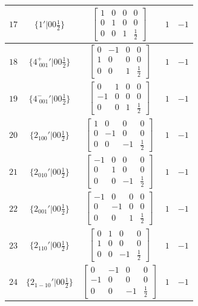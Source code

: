 \documentclass[fleqn,8pt]{jsarticle}
\begin{document}
\begin{longtable}{ccccc}
$ 17 $ & $ \{1{}'|0 0 \frac{1}{2}\} $ & $ \begin{bmatrix} 1 & 0 & 0 & 0 \\ 0 & 1 & 0 & 0 \\ 0 & 0 & 1 & \frac{1}{2} \end{bmatrix} $ & $ 1 $ & $ -1 $ \\ \hline
$ 18 $ & $ \{4^{+}_{\,\,001}{}'|0 0 \frac{1}{2}\} $ & $ \begin{bmatrix} 0 & -1 & 0 & 0 \\ 1 & 0 & 0 & 0 \\ 0 & 0 & 1 & \frac{1}{2} \end{bmatrix} $ & $ 1 $ & $ -1 $ \\ \hline
$ 19 $ & $ \{4^{-}_{\,\,001}{}'|0 0 \frac{1}{2}\} $ & $ \begin{bmatrix} 0 & 1 & 0 & 0 \\ -1 & 0 & 0 & 0 \\ 0 & 0 & 1 & \frac{1}{2} \end{bmatrix} $ & $ 1 $ & $ -1 $ \\ \hline
$ 20 $ & $ \{2{}_{100}{}'|0 0 \frac{1}{2}\} $ & $ \begin{bmatrix} 1 & 0 & 0 & 0 \\ 0 & -1 & 0 & 0 \\ 0 & 0 & -1 & \frac{1}{2} \end{bmatrix} $ & $ 1 $ & $ -1 $ \\ \hline
$ 21 $ & $ \{2{}_{010}{}'|0 0 \frac{1}{2}\} $ & $ \begin{bmatrix} -1 & 0 & 0 & 0 \\ 0 & 1 & 0 & 0 \\ 0 & 0 & -1 & \frac{1}{2} \end{bmatrix} $ & $ 1 $ & $ -1 $ \\ \hline
$ 22 $ & $ \{2{}_{001}{}'|0 0 \frac{1}{2}\} $ & $ \begin{bmatrix} -1 & 0 & 0 & 0 \\ 0 & -1 & 0 & 0 \\ 0 & 0 & 1 & \frac{1}{2} \end{bmatrix} $ & $ 1 $ & $ -1 $ \\ \hline
$ 23 $ & $ \{2{}_{110}{}'|0 0 \frac{1}{2}\} $ & $ \begin{bmatrix} 0 & 1 & 0 & 0 \\ 1 & 0 & 0 & 0 \\ 0 & 0 & -1 & \frac{1}{2} \end{bmatrix} $ & $ 1 $ & $ -1 $ \\ \hline
$ 24 $ & $ \{2{}_{1-10}{}'|0 0 \frac{1}{2}\} $ & $ \begin{bmatrix} 0 & -1 & 0 & 0 \\ -1 & 0 & 0 & 0 \\ 0 & 0 & -1 & \frac{1}{2} \end{bmatrix} $ & $ 1 $ & $ -1 $ \\ \hline

\end{longtable}
\end{document}
